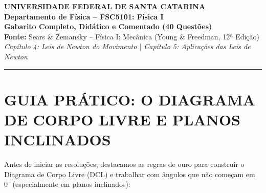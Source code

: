 \documentclass[11pt,a4paper]{article}
\begin{document}
\begin{center}
    {\LARGE \textbf{UNIVERSIDADE FEDERAL DE SANTA CATARINA}}\\[0.2cm]
    {\large \textbf{Departamento de Física -- FSC5101: Física I}}\\[0.3cm]
    {\Large \textbf{Gabarito Completo, Didático e Comentado (40 Questões)}}\\[0.2cm]
    {\normalsize \textbf{Fonte:} Sears \& Zemansky -- Física I: Mecânica (Young \& Freedman, 12ª Edição)}\\[0.1cm]
    {\small \textit{Capítulo 4: Leis de Newton do Movimento \quad $\vert$ \quad Capítulo 5: Aplicações das Leis de Newton}}\\[0.2cm]
    \rule{\textwidth}{0.8pt}
\end{center}

\vspace{0.2cm}

\section*{GUIA PRÁTICO: O DIAGRAMA DE CORPO LIVRE E PLANOS INCLINADOS}

Antes de iniciar as resoluções, destacamos as regras de ouro para construir o Diagrama de Corpo Livre (DCL) e trabalhar com ângulos que não começam em $0^\circ$ (especialmente em planos inclinados):
\end{document}
